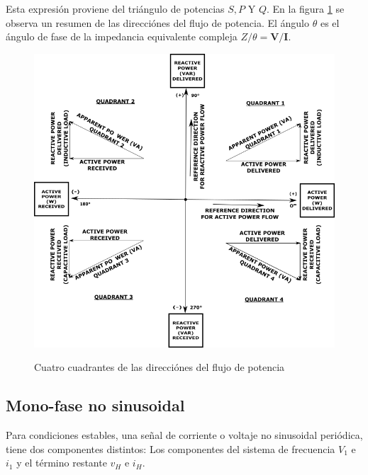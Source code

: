 Esta expresión proviene del triángulo de potencias $S,P$ Y $Q$. En la figura \ref{fig:triangulo} se observa un resumen de las direcciónes del flujo de potencia. El ángulo $\theta$ es el ángulo de fase de la impedancia equivalente compleja $Z/ \theta = \textbf{V/I}$.\cite{A30}\\ 

\begin{figure}[H]
\centering
\includegraphics[width = 18cm]{2Marco/triangulopotencias}
\caption{ Cuatro cuadrantes de las direcciónes del flujo de potencia} \cite{A30} 
\label{fig:triangulo}
\end{figure} 


\subsection{Mono-fase no sinusoidal}

Para condiciones estables, una señal de corriente o voltaje no sinusoidal periódica, tiene dos componentes distintos: Los componentes del sistema de frecuencia $V_{1}$ e $i_{1}$ y el término restante $v_{H}$ e $i_{H}$.\cite{A30}\\


